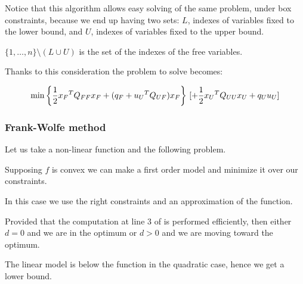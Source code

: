 \documentclass[ComputationalMathematics.tex]{subfiles}
\begin{document}
Notice that this algorithm allows easy solving of the same problem, under box constraints, because we end up having two sets: $L$, indexes of variables fixed to the lower bound, and $U$, indexes of variables fixed to the upper bound.

$\{1, \ldots, n\} \setminus (L \cup U)$ is the set of the indexes of the free variables.

Thanks to this consideration the problem to solve becomes:

\[
  \min \bigg \{\frac{1}{2} {x_F}^{T} Q_{FF} x_F + (q_F + {u_U}^{T} Q_{UF}) x_F \bigg \}~[+ \frac{1}{2} {x_U}^{T} Q_{UU} x_U + q_U u_U]
\]

\subsubsection{Frank-Wolfe method}
Let us take a non-linear function and the following problem.


Supposing $f$ is convex we can make a first order model and minimize it over our constraints.

In this case we use the right constraints and an approximation of the function.


Provided that the computation at line $3$ of  is performed efficiently, then either $d=0$ and we are in the optimum or $d>0$ and we are moving toward the optimum.

The linear model is below the function in the quadratic case, hence we get a lower bound.
\end{document}
